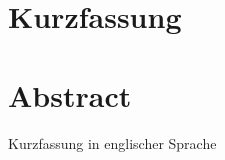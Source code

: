 \section*{Kurzfassung}

\blindtext{}


\section*{Abstract}

Kurzfassung in englischer Sprache

\blindtext{}